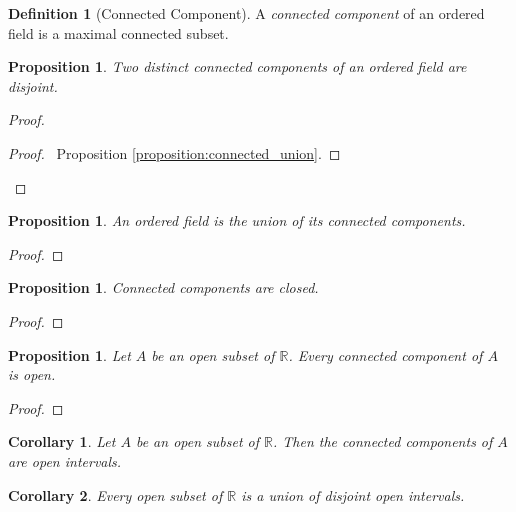 \documentclass{article}
\let\qed\relax
\newtheorem{proposition}[axiom]{Proposition}
\newtheorem{corollary}{Corollary}[axiom]
\theoremstyle{definition}
\newtheorem{definition}[axiom]{Definition}
\begin{document}
\begin{definition}[Connected Component]
    A \emph{connected component} of an ordered field is a maximal connected subset.
\end{definition}

\begin{proposition}
    Two distinct connected components of an ordered field are disjoint.
\end{proposition}

\begin{proof}
    \pf
    \begin{proof}
        \pf\ Proposition \ref{proposition:connected_union}.
    \end{proof}
    \qed
\end{proof}

\begin{proposition}
    An ordered field is the union of its connected components.
\end{proposition}

\begin{proof}
    \pf
    \qed
\end{proof}

\begin{proposition}
    Connected components are closed.
\end{proposition}

\begin{proof}
    \pf
    \qed
\end{proof}

\begin{proposition}
    Let $A$ be an open subset of $\mathbb{R}$. Every connected component of $A$ is open.
\end{proposition}

\begin{proof}
    \pf
    \qed
\end{proof}

\begin{corollary}
    Let $A$ be an open subset of $\mathbb{R}$. Then the connected components of $A$ are open intervals.
\end{corollary}

\begin{corollary}
    Every open subset of $\mathbb{R}$ is a union of disjoint open intervals.
\end{corollary}
\end{document}
